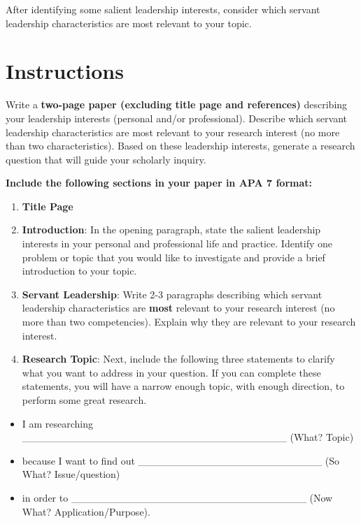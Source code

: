\documentclass[
  letterpaper,
  DIV=11,
  numbers=noendperiod]{scrreprt}
\providecommand{\tightlist}{%
  \setlength{\itemsep}{0pt}\setlength{\parskip}{0pt}}\usepackage{longtable,booktabs,array}
\begin{document}
After identifying some salient leadership interests, consider which
servant leadership characteristics are most relevant to your topic.

\section{Instructions}\label{instructions-5}

Write a \textbf{two-page paper (excluding title page and references)}
describing your leadership interests (personal and/or professional).
Describe which servant leadership characteristics are most relevant to
your research interest (no more than two characteristics). Based on
these leadership interests, generate a research question that will guide
your scholarly inquiry.

\textbf{Include the following sections in your paper in APA 7 format:}

\begin{enumerate}
\def\labelenumi{\arabic{enumi}.}
\tightlist
\item
  \textbf{Title Page}
\item
  \textbf{Introduction}: In the opening paragraph, state the salient
  leadership interests in your personal and professional life and
  practice. Identify one problem or topic that you would like to
  investigate and provide a brief introduction to your topic.
\item
  \textbf{Servant Leadership}: Write 2-3 paragraphs describing which
  servant leadership characteristics are \textbf{most} relevant to your
  research interest (no more than two competencies). Explain why they
  are relevant to your research interest.
\item
  \textbf{Research Topic}: Next, include the following three statements
  to clarify what you want to address in your question. If you can
  complete these statements, you will have a narrow enough topic, with
  enough direction, to perform some great research.
\end{enumerate}

\begin{itemize}
\tightlist
\item
  I am researching
  \_\_\_\_\_\_\_\_\_\_\_\_\_\_\_\_\_\_\_\_\_\_\_\_\_\_\_\_\_\_\_\_\_\_\_\_
  (What? Topic)
\item
  because I want to find out
  \_\_\_\_\_\_\_\_\_\_\_\_\_\_\_\_\_\_\_\_\_\_\_\_\_ (So What?
  Issue/question)
\item
  in order to
  \_\_\_\_\_\_\_\_\_\_\_\_\_\_\_\_\_\_\_\_\_\_\_\_\_\_\_\_\_\_\_\_ (Now
  What? Application/Purpose).
\end{itemize}
\end{document}
